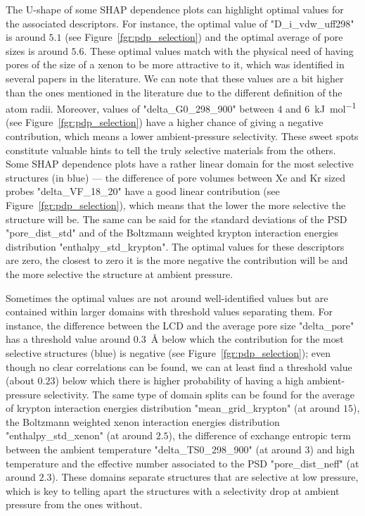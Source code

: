\documentclass[main]{subfiles}
\begin{document}
The U-shape of some SHAP dependence plots can highlight optimal values for the associated descriptors. For instance, the optimal value of "D\_i\_vdw\_uff298" is around $5.1$ (see Figure~\ref{fgr:pdp_selection}) and the optimal average of pore sizes is around $5.6$. These optimal values match with the physical need of having pores of the size of a xenon to be more attractive to it, which was identified in several papers in the literature. We can note that these values are a bit higher than the ones mentioned in the literature due to the different definition of the atom radii.\autocite{Hung_2021} Moreover, values of "delta\_G0\_298\_900" between $4$ and \SI{6}{\kilo\joule\per\mole} (see Figure~\ref{fgr:pdp_selection}) have a higher chance of giving a negative contribution, which means a lower ambient-pressure selectivity. These sweet spots constitute valuable hints to tell the truly selective materials from the others. Some SHAP dependence plots have a rather linear domain for the most selective structures (in blue) --- the difference of pore volumes between Xe and Kr sized probes "delta\_VF\_18\_20" have a good linear contribution (see Figure~\ref{fgr:pdp_selection}), which means that the lower the more selective the structure will be. The same can be said for the standard deviations of the PSD "pore\_dist\_std" and of the Boltzmann weighted krypton interaction energies distribution "enthalpy\_std\_krypton". The optimal values for these descriptors are zero, the closest to zero it is the more negative the contribution will be and the more selective the structure at ambient pressure.

Sometimes the optimal values are not around well-identified values but are contained within larger domains with threshold values separating them. For instance, the difference between the LCD and the average pore size "delta\_pore" has a threshold value around \SI{0.3}{\angstrom} below which the contribution for the most selective structures (blue) is negative (see Figure~\ref{fgr:pdp_selection}); even though no clear correlations can be found, we can at least find a threshold value (about $0.23$) below which there is higher probability of having a high ambient-pressure selectivity. The same type of domain splits can be found for the average of krypton interaction energies distribution "mean\_grid\_krypton" (at around $15$), the Boltzmann weighted xenon interaction energies distribution "enthalpy\_std\_xenon" (at around $2.5$), the difference of exchange entropic term between the ambient temperature "delta\_TS0\_298\_900" (at around $3$) and high temperature and the effective number associated to the PSD "pore\_dist\_neff" (at around $2.3$). These domains separate structures that are selective at low pressure, which is key to telling apart the structures with a selectivity drop at ambient pressure from the ones without.
\end{document}
